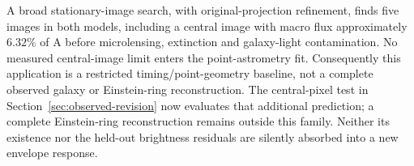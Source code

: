 A broad stationary-image search, with original-projection refinement,
finds five images in both models, including a central image with macro
flux approximately $6.32\%$ of A before microlensing, extinction and
galaxy-light contamination. No measured central-image limit enters the
point-astrometry fit. Consequently this application is a restricted
timing/point-geometry baseline, not a complete observed galaxy or
Einstein-ring reconstruction. The central-pixel test in
Section~\ref{sec:observed-revision} now evaluates that additional prediction;
a complete Einstein-ring reconstruction remains outside this family.
Neither its existence nor the held-out brightness residuals are silently
absorbed into a new envelope response.
